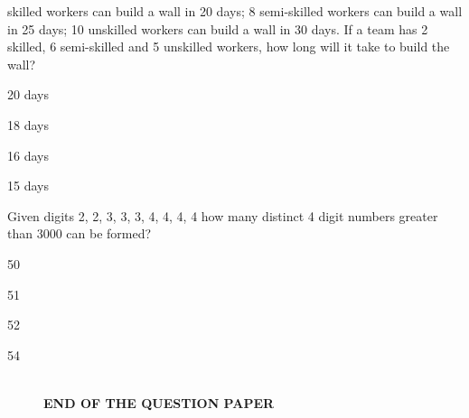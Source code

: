 \documentclass{exam}
\begin{document}
\begin{questions}
 skilled workers can build a wall in 20 days; 8 semi-skilled workers can build a wall in 25 days; 10 unskilled workers can build a wall in 30 days. If a team has 2 skilled, 6 semi-skilled and 5 unskilled workers, how long will it take to build the wall?\hfill{}

\begin{enumerate} \begin{multicols}{4}
	\item 20 days \item 18 days \item 16 days \item 15 days
\end{multicols} \end{enumerate}

\question Given digits 2, 2, 3, 3, 3, 4, 4, 4, 4 how many distinct 4 digit numbers greater than 3000 can be formed?\hfill{}

\begin{enumerate} \begin{multicols}{4}
	\item 50 \item 51 \item 52 \item 54
\end{multicols} \end{enumerate}
\end{questions}

\begin{figure}[H] \centering
	\hrulefill\\
	\textbf{END OF THE QUESTION PAPER}
\end{figure}
\end{document}
